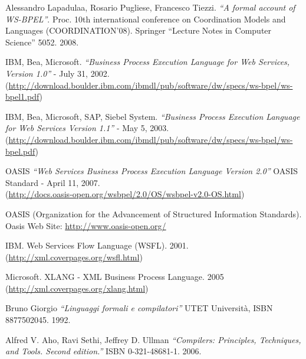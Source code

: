 \begin{thebibliography}{99}

 Alessandro Lapadulaa, Rosario Pugliese, Francesco
Tiezzi. \emph{``A formal account of WS-BPEL''}. Proc. 10th international
conference on Coordination Models and Languages (COORDINATION'08). Springer ``Lecture Notes in Computer Science''
5052. 2008.

 IBM, Bea, Microsoft. \emph{``Business Process Execution
Language for Web Services, Version 1.0''} - July 31, 2002. \\
(\href{http://download.boulder.ibm.com/ibmdl/pub/software/dw/specs/ws-bpel/ws-bpel1.pdf}{http://download.boulder.ibm.com/ibmdl/pub/software/dw/specs/ws-bpel/ws-bpel1.pdf})

 IBM, Bea, Microsoft, SAP, Siebel System. \emph{``Business
Process Execution Language for Web Services Version 1.1''} - May 5, 2003. \\
(\href{http://download.boulder.ibm.com/ibmdl/pub/software/dw/specs/ws-bpel/ws-bpel.pdf}{http://download.boulder.ibm.com/ibmdl/pub/software/dw/specs/ws-bpel/ws-bpel.pdf})

 OASIS \emph{``Web Services Business Process Execution
Language Version 2.0''} OASIS Standard - April 11, 2007. \\
(\href{http://docs.oasis-open.org/wsbpel/2.0/OS/wsbpel-v2.0-OS.html}{http://docs.oasis-open.org/wsbpel/2.0/OS/wsbpel-v2.0-OS.html})

 OASIS (Organization for the Advancement of Structured
Information Standards). \\
Oasis Web Site:
\href{http://www.oasis-open.org/}{http://www.oasis-open.org/}

 IBM. Web Services Flow Language (WSFL). 2001.\\
(\href{http://xml.coverpages.org/wsfl.html}{http://xml.coverpages.org/wsfl.html})

 Microsoft. XLANG - XML Business Process Language. 2005 \\
(\href{http://xml.coverpages.org/xlang.html}{http://xml.coverpages.org/xlang.html})

 Bruno Giorgio \emph{``Linguaggi formali e compilatori''} 
UTET Università, ISBN 8877502045. 1992.

 Alfred V. Aho, Ravi Sethi, Jeffrey D. Ullman
\emph{``Compilers: Principles, Techniques, and Tools. Second edition.''} ISBN
0-321-48681-1. 2006.


\end{thebibliography}
